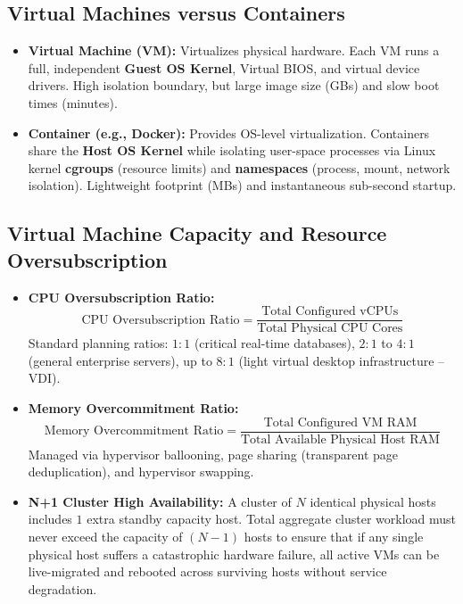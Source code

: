\subsection{Virtual Machines versus Containers}
\begin{itemize}
    \item \textbf{Virtual Machine (VM):} Virtualizes physical hardware. Each VM runs a full, independent \textbf{Guest OS Kernel}, Virtual BIOS, and virtual device drivers. High isolation boundary, but large image size (GBs) and slow boot times (minutes).
    \item \textbf{Container (e.g., Docker):} Provides OS-level virtualization. Containers share the \textbf{Host OS Kernel} while isolating user-space processes via Linux kernel \textbf{cgroups} (resource limits) and \textbf{namespaces} (process, mount, network isolation). Lightweight footprint (MBs) and instantaneous sub-second startup.
\end{itemize}

\subsection{Virtual Machine Capacity and Resource Oversubscription}
\begin{itemize}
    \item \textbf{CPU Oversubscription Ratio:}
    \begin{equation}
    \boxed{\text{CPU Oversubscription Ratio} = \frac{\text{Total Configured vCPUs}}{\text{Total Physical CPU Cores}}}
    \end{equation}
    Standard planning ratios: $1:1$ (critical real-time databases), $2:1$ to $4:1$ (general enterprise servers), up to $8:1$ (light virtual desktop infrastructure -- VDI).
    \item \textbf{Memory Overcommitment Ratio:}
    \begin{equation}
    \boxed{\text{Memory Overcommitment Ratio} = \frac{\text{Total Configured VM RAM}}{\text{Total Available Physical Host RAM}}}
    \end{equation}
    Managed via hypervisor ballooning, page sharing (transparent page deduplication), and hypervisor swapping.
    \item \textbf{N+1 Cluster High Availability:}
    A cluster of $N$ identical physical hosts includes $1$ extra standby capacity host. Total aggregate cluster workload must never exceed the capacity of $(N - 1)$ hosts to ensure that if any single physical host suffers a catastrophic hardware failure, all active VMs can be live-migrated and rebooted across surviving hosts without service degradation.
\end{itemize}



